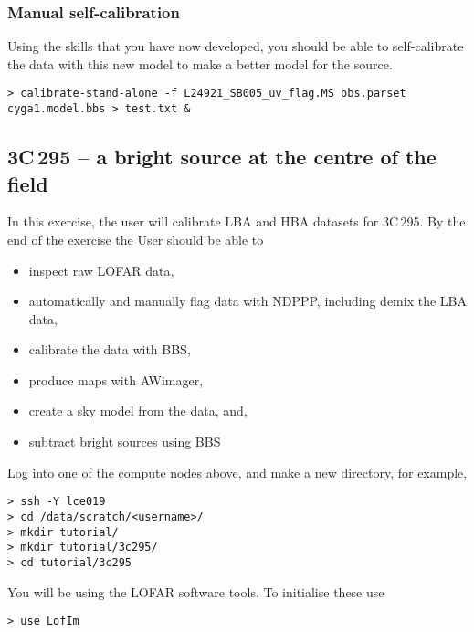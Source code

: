\subsubsection{Manual self-calibration}

Using the skills that you have now developed, you should be able to self-calibrate the data with this new model to make a better model for the source.

\begin{verbatim}
> calibrate-stand-alone -f L24921_SB005_uv_flag.MS bbs.parset cyga1.model.bbs > test.txt &
\end{verbatim}



\newpage

\subsection{3C\,295 -- a bright source at the centre of the field}
\label{sect:new_tutorial}

In this exercise, the user will calibrate LBA and HBA datasets for 3C\,295. By the end of the exercise the
User should be able to
\begin{itemize}
\item  inspect raw LOFAR data,
\item  automatically and manually flag data with NDPPP, including demix the LBA data,
\item  calibrate the data with BBS,
\item  produce maps with AWimager,
\item  create a sky model from the data, and,
\item  subtract bright sources using BBS
\end{itemize}



Log into one of the compute nodes above, and make a new directory, for example,
\begin{verbatim}
> ssh -Y lce019
> cd /data/scratch/<username>/
> mkdir tutorial/
> mkdir tutorial/3c295/
> cd tutorial/3c295
\end{verbatim}
You will be using the LOFAR software tools. To initialise  these use
\begin{verbatim}
> use LofIm
\end{verbatim}

